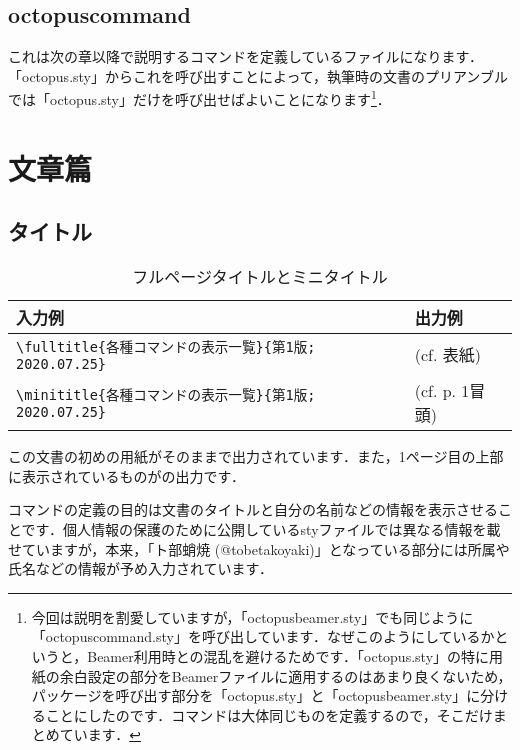 \documentclass[uplatex]{jsreport}
\begin{document}
\section{octopuscommand}
これは次の章以降で説明するコマンドを定義しているファイルになります．「octopus.sty」からこれを呼び出すことによって，執筆時の文書のプリアンブルでは「octopus.sty」だけを呼び出せばよいことになります\footnote{今回は説明を割愛していますが，「octopusbeamer.sty」でも同じように「octopuscommand.sty」を呼び出しています．なぜこのようにしているかというと，Beamer利用時との混乱を避けるためです．「octopus.sty」の特に用紙の余白設定の部分をBeamerファイルに適用するのはあまり良くないため，パッケージを呼び出す部分を「octopus.sty」と「octopusbeamer.sty」に分けることにしたのです．コマンドは大体同じものを定義するので，そこだけまとめています．}．

\chapter{文章篇}
\section{タイトル}
\begin{table}[htbp]
  \centering
  \caption{フルページタイトルとミニタイトル}
  \label{table:1.title}
  \begin{tabular}{ll}\hline
    入力例 & 出力例 \\ \hline
    \verb|\fulltitle{各種コマンドの表示一覧}{第1版; 2020.07.25}| & (cf. 表紙) \\
    \verb|\minititle{各種コマンドの表示一覧}{第1版; 2020.07.25}| & (cf. p. 1冒頭) \\ \hline
  \end{tabular}
\end{table}
この文書の初めの用紙がそのままで出力されています．また，1ページ目の上部に表示されているものがの出力です．\par
コマンドの定義の目的は文書のタイトルと自分の名前などの情報を表示させることです．個人情報の保護のために公開しているstyファイルでは異なる情報を載せていますが，本来，「ト部蛸焼 (@tobetakoyaki)」となっている部分には所属や氏名などの情報が予め入力されています．\par
\end{document}
